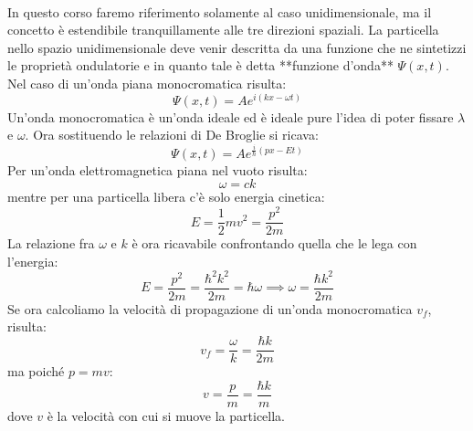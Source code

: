 \documentclass{book}
\begin{document}
        \paragraph{}
            In questo corso faremo riferimento solamente al caso unidimensionale, ma il concetto è estendibile tranquillamente alle tre direzioni spaziali. La particella nello spazio unidimensionale deve venir descritta da una funzione che ne sintetizzi le proprietà ondulatorie e in quanto tale è detta **funzione d'onda** $\Psi (x,t)$. Nel caso di un'onda piana monocromatica risulta:
            $$\Psi (x,t) = Ae^{i(kx - \omega t)}$$
            Un'onda monocromatica è un'onda ideale ed è ideale pure l'idea di poter fissare $\lambda$ e $\omega$. Ora sostituendo le relazioni di De Broglie si ricava:
            $$ \displaystyle \Psi (x,t) = A e^{\frac{i}{\hbar}(px-Et)}$$
            Per un'onda elettromagnetica piana nel vuoto risulta:
            $$\omega = ck$$
            mentre per una particella libera c'è solo energia cinetica:
            $$E = \frac{1}{2}mv^{2} = \frac{p^{2}}{2m}$$
            La relazione fra $\omega$ e $k$ è ora ricavabile confrontando quella che le lega con l'energia:
            $$E = \frac{p^{2}}{2m} = \frac{\hbar ^{2} k^{2}}{2m} = \hbar \omega \implies \omega = \frac{\hbar k^{2}}{2m}$$
            Se ora calcoliamo la velocità di propagazione di un'onda monocromatica $v_{f}$, risulta:
            $$v_{f} = \frac{\omega}{k} = \frac{\hbar k}{2m}$$
            ma poiché $p = mv$:
            $$v = \frac{p}{m} = \frac{\hbar k}{m}$$
            dove $v$ è la velocità con cui si muove la particella.
\end{document}
